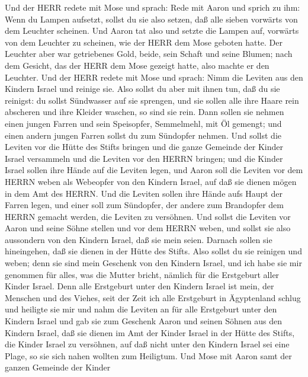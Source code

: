  Und der HERR redete mit Mose und sprach:  Rede
mit Aaron und sprich zu ihm: Wenn du Lampen aufsetzt, sollst du sie also
setzen, daß alle sieben vorwärts von dem Leuchter scheinen. 
Und Aaron tat also und setzte die Lampen auf, vorwärts von dem Leuchter
zu scheinen, wie der HERR dem Mose geboten hatte.  Der
Leuchter aber war getriebenes Gold, beide, sein Schaft und seine Blumen;
nach dem Gesicht, das der HERR dem Mose gezeigt hatte, also machte er
den Leuchter.  Und der HERR redete mit Mose und sprach:
 Nimm die Leviten aus den Kindern Israel und reinige sie.
 Also sollst du aber mit ihnen tun, daß du sie reinigst: du
sollst Sündwasser auf sie sprengen, und sie sollen alle ihre Haare rein
abscheren und ihre Kleider waschen, so sind sie rein.  Dann
sollen sie nehmen einen jungen Farren und sein Speisopfer, Semmelmehl,
mit Öl gemengt; und einen andern jungen Farren sollst du zum Sündopfer
nehmen.  Und sollst die Leviten vor die Hütte des Stifts
bringen und die ganze Gemeinde der Kinder Israel versammeln
 und die Leviten vor den HERRN bringen; und die Kinder
Israel sollen ihre Hände auf die Leviten legen,  und Aaron
soll die Leviten vor dem HERRN weben als Webeopfer von den Kindern
Israel, auf daß sie dienen mögen in dem Amt des HERRN.  Und
die Leviten sollen ihre Hände aufs Haupt der Farren legen, und einer
soll zum Sündopfer, der andere zum Brandopfer dem HERRN gemacht werden,
die Leviten zu versöhnen.  Und sollst die Leviten vor Aaron
und seine Söhne stellen und vor dem HERRN weben,  und
sollst sie also aussondern von den Kindern Israel, daß sie mein seien.
 Darnach sollen sie hineingehen, daß sie dienen in der
Hütte des Stifts. Also sollst du sie reinigen und weben; 
denn sie sind mein Geschenk von den Kindern Israel, und ich habe sie mir
genommen für alles, was die Mutter bricht, nämlich für die Erstgeburt
aller Kinder Israel.  Denn alle Erstgeburt unter den
Kindern Israel ist mein, der Menschen und des Viehes, seit der Zeit ich
alle Erstgeburt in Ägyptenland schlug und heiligte sie mir 
und nahm die Leviten an für alle Erstgeburt unter den Kindern Israel
 und gab sie zum Geschenk Aaron und seinen Söhnen aus den
Kindern Israel, daß sie dienen im Amt der Kinder Israel in der Hütte des
Stifts, die Kinder Israel zu versöhnen, auf daß nicht unter den Kindern
Israel sei eine Plage, so sie sich nahen wollten zum Heiligtum.
 Und Mose mit Aaron samt der ganzen Gemeinde der Kinder
